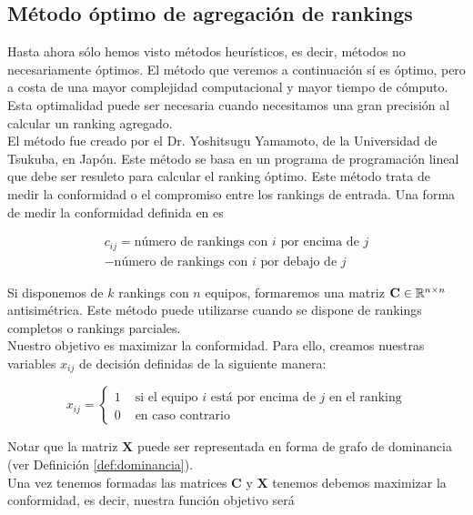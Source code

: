 \subsection{Método óptimo de agregación de rankings}

Hasta ahora sólo hemos visto métodos heurísticos, es decir, métodos no necesariamente óptimos. El método que veremos a continuación sí es óptimo, pero a costa de una mayor complejidad computacional y mayor tiempo de cómputo. Esta optimalidad puede ser necesaria cuando necesitamos una gran precisión al calcular un ranking agregado.\\

El método fue creado por el Dr. Yoshitsugu Yamamoto, de la Universidad de Tsukuba, en Japón. Este método se basa en un programa de programación lineal que debe ser resuleto para calcular el ranking óptimo. Este método trata de medir la conformidad o el compromiso entre los rankings de entrada. Una forma de medir la conformidad definida en \cite{langville2012s} es

\begin{multline} \label{eq:conformidad}
c_{ij} = \text{número de rankings con $i$ por encima de $j$} \\ - \text{número de rankings con $i$ por debajo de $j$}
\end{multline}

Si disponemos de $k$ rankings con $n$ equipos, formaremos una matriz $\mathbf{C} \in \mathbb{R}^{n\times n}$ antisimétrica. Este método puede utilizarse cuando se dispone de rankings completos o rankings parciales.\\

Nuestro objetivo es maximizar la conformidad. Para ello, creamos nuestras variables $x_{ij}$ de decisión definidas de la siguiente manera:

\begin{equation}
x_{ij} = \begin{cases}
1 & \text{ si el equipo $i$ está por encima de $j$ en el ranking}\\
0 & \text{ en caso contrario}
\end{cases}
\end{equation}

Notar que la matriz $\mathbf{X}$ puede ser representada en forma de grafo de dominancia (ver Definición \ref{def:dominancia}).\\

Una vez tenemos formadas las matrices $\mathbf{C}$ y $\mathbf{X}$ tenemos debemos maximizar la conformidad, es decir, nuestra función objetivo será

